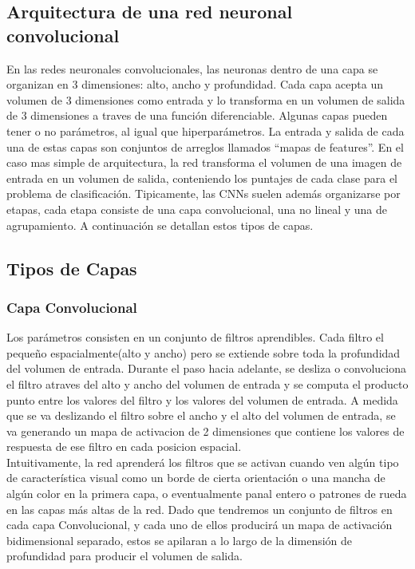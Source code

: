 \documentclass[a4paper,11pt,spanish]{book}
\begin{document}
    \subsection {Arquitectura de una red neuronal convolucional}
      En las redes neuronales convolucionales, las neuronas dentro de una capa se organizan en 3 dimensiones: alto, ancho y profundidad.
      Cada capa acepta un volumen de 3 dimensiones como entrada y lo transforma en un volumen de salida de 3 dimensiones a traves de una función diferenciable.
      Algunas capas pueden tener o no parámetros, al igual que hiperparámetros. La entrada y salida de cada una de estas capas son conjuntos de arreglos llamados “mapas de features”.
      En el caso mas simple de arquitectura, la red transforma el volumen de una imagen de entrada en un volumen de salida, conteniendo los puntajes de cada clase para el problema de clasificación.
      Tipicamente, las CNNs suelen además organizarse por etapas, cada etapa consiste de una capa convolucional, una no lineal y una de agrupamiento.
      A continuación se detallan estos tipos de capas.

    \subsection {Tipos de Capas}
      \subsubsection{Capa Convolucional}
	Los parámetros consisten en un conjunto de filtros aprendibles. Cada filtro el pequeño espacialmente(alto y ancho) pero se extiende sobre toda la profundidad del volumen de entrada.
	Durante el paso hacia adelante, se desliza o convoluciona el filtro atraves del alto y ancho del volumen de entrada y se computa el producto punto entre los valores del filtro y los valores
	del volumen de entrada. A medida que se va deslizando el filtro sobre el ancho y el alto del volumen de entrada, se va generando un mapa de activacion de 2 dimensiones que contiene los
	valores de respuesta de ese filtro en cada posicion espacial.\\
	Intuitivamente, la red aprenderá los filtros que se activan cuando ven algún tipo de característica visual como un borde de cierta orientación o una mancha de algún color en la
	primera capa, o eventualmente panal entero o patrones de rueda en las capas más altas de la red. Dado que tendremos un conjunto de filtros en cada capa Convolucional,
	y cada uno de ellos producirá un mapa de activación bidimensional separado, estos se apilaran a lo largo de la dimensión de profundidad para producir el volumen de salida.\\
\end{document}
